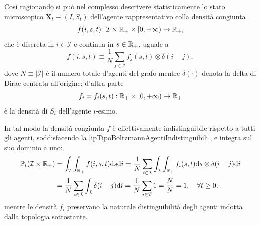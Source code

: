                 Cosí ragionando si può nel complesso descrivere statisticamente lo stato microscopico \(\mathbf X_t\equiv(I,S_t)\) dell'agente rappresentativo colla densità congiunta
                \begin{equation*}
                    f(i,s,t)\colon\mathcal I\times\mathbb R_+\times[0,+\infty)\to\mathbb R_+,
                \end{equation*}
                che è discreta in \(i\in\mathcal I\) e continua in \(s\in\mathbb R_+\), uguale a
                \begin{equation}
                    \label{eqDensitàCongiuntaUrbana}
                    f(i,s,t)\equiv\frac1N\sum_{j\in\mathcal I}f_j(s,t)\otimes\delta(i-j),
                \end{equation}
                dove \(N\equiv\vert\mathcal I\vert\) è il numero totale d'agenti del grafo mentre \(\delta(\cdot)\) denota la delta di Dirac centrata all'origine; d'altra parte
                \begin{equation*}
                    f_i=f_i(s,t):\mathbb R_+\times[0,+\infty)\rightarrow\mathbb R_+
                \end{equation*}
                è la densità di \(S_t\) dell'agente \(i\)-esimo.

                In tal modo la densità congiunta \(f\) è effettivamente indistinguibile rispetto a tutti gli agenti, soddisfacendo la \ref{ipTipoBoltzmannAgentiIndistinguibili}, e integra sul suo dominio a uno:
                \begin{equation*}
                    \begin{aligned}
                        \mathbb P_t(\mathcal I\times\mathbb R_+)
                        &=\int_{\mathcal I}\int_{\mathbb R_+}f(i,s,t)\mathrm{d} s\mathrm{d} i
                        =\frac1N\sum_{i\in\mathcal I}\int_{\mathcal I}\int_{\mathbb R_+}
                        f_i(s,t)\mathrm{d} s\otimes\delta(i-j)\mathrm{d} i
                        \\&=\frac1N\sum_{i\in\mathcal I}\int_{\mathcal I}\delta(i-j)\mathrm{d} i
                        =\frac1N\sum_{i\in\mathcal I}1=\frac NN=1,
                        \quad\forall t\geq0;
                    \end{aligned}
                \end{equation*}
                mentre le densità \(f_i\) preservano la naturale distinguibilità degli agenti indotta dalla topologia sottostante.

